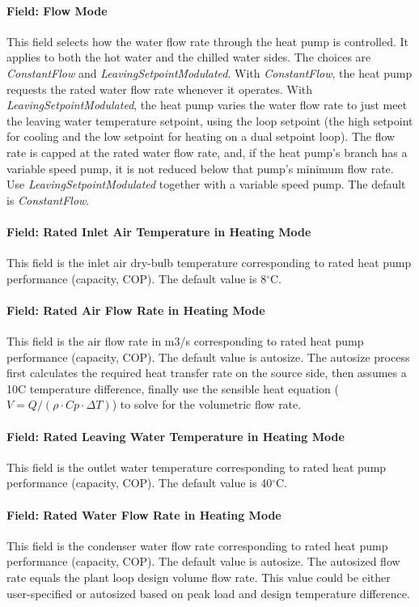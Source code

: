 \paragraph{Field: Flow Mode} This field selects how the water flow rate through
the heat pump is controlled. It applies to both the hot water and the chilled
water sides. The choices are \emph{ConstantFlow} and
\emph{LeavingSetpointModulated}. With \emph{ConstantFlow}, the heat pump requests
the rated water flow rate whenever it operates. With
\emph{LeavingSetpointModulated}, the heat pump varies the water flow rate to just
meet the leaving water temperature setpoint, using the loop setpoint (the high
setpoint for cooling and the low setpoint for heating on a dual setpoint loop).
The flow rate is capped at the rated water flow rate, and, if the heat pump's
branch has a variable speed pump, it is not reduced below that pump's minimum
flow rate. Use \emph{LeavingSetpointModulated} together with a variable speed
pump. The default is \emph{ConstantFlow}.
\paragraph{Field: Rated Inlet Air Temperature in Heating Mode} This field is the
inlet air dry-bulb temperature corresponding to rated heat pump performance
(capacity, COP). The default value is 8$^\circ$C.
\paragraph{Field: Rated Air Flow Rate in Heating Mode} This field is the air
flow rate in m3/s corresponding to rated heat pump performance (capacity, COP).
The default value is autosize.
The autosize process first calculates the required heat transfer rate on the source
side, then assumes a 10C temperature difference, finally use the sensible heat
equation ($V = Q / (\rho \cdot Cp \cdot \Delta T)$) to solve for the volumetric flow rate.
\paragraph{Field: Rated Leaving Water Temperature in Heating Mode} This field is
the outlet water temperature corresponding to rated heat pump performance
(capacity, COP). The default value is 40$^\circ$C.
\paragraph{Field: Rated Water Flow Rate in Heating Mode} This field is the
condenser water flow rate corresponding to rated heat pump performance
(capacity, COP). The default value is autosize.
The autosized flow rate equals the plant loop design volume flow rate.
This value could be either user-specified or autosized based on peak load and design
temperature difference.

